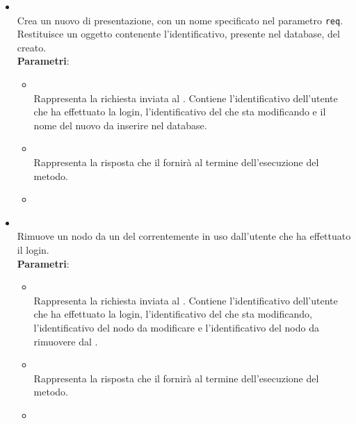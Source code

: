 \begin{itemize}
\begin{itemize}
\begin{itemize}
\\ \dpNext
\end{itemize}
\item {}
\\ Crea un nuovo  di presentazione, con un nome specificato nel parametro \texttt{req}. Restituisce un oggetto  contenente l’identificativo, presente nel database, del  creato.
\\ \textbf{Parametri}:
\begin{itemize}
\item {}
\\ Rappresenta la richiesta inviata al . Contiene l’identificativo dell’utente che ha effettuato la login, l’identificativo del  che sta modificando e il nome del nuovo  da inserire nel database.
\item {}
\\ Rappresenta la risposta che il  fornirà al termine dell’esecuzione del metodo.
\item {}
\\ \dpNext
\end{itemize}
\item {}
\\ Rimuove un nodo da un  del  correntemente in uso dall’utente che ha effettuato il login.
\\ \textbf{Parametri}:
\begin{itemize}
\item {}
\\ Rappresenta la richiesta inviata al . Contiene l’identificativo dell’utente che ha effettuato la login, l’identificativo del  che sta modificando, l’identificativo del nodo da modificare e l’identificativo del nodo da rimuovere dal .
\item {}
\\ Rappresenta la risposta che il  fornirà al termine dell’esecuzione del metodo.
\item {}
\\ \dpNext
\end{itemize}

\end{itemize}
\end{itemize}
